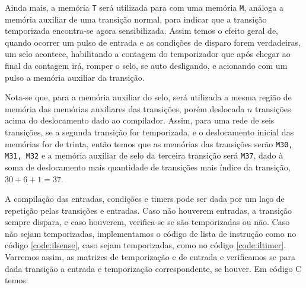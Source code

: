Ainda mais, a memória \lstinline{T} será utilizada para com uma memória \lstinline{M}, análoga a memória auxiliar de uma transição normal, para indicar que a transição temporizada encontra-se agora sensibilizada. Assim temos o efeito geral de, quando ocorrer um pulso de entrada e as condições de disparo forem verdadeiras, um selo acontece, habilitando a contagem do temporizador que após chegar ao final da contagem irá, romper o selo, se auto desligando, e acionando com um pulso a memória auxiliar da transição.




Nota-se que, para a memória auxiliar do selo, será utilizada a mesma região de memória das memórias auxiliares das transições, porém deslocada $n$ transições acima do deslocamento dado ao compilador. Assim, para uma rede de seis transições, se a segunda transição for temporizada, e o deslocamento inicial das memórias for de trinta, então temos que as memórias das transições serão \lstinline{M30, M31, M32} e a memória auxiliar de selo da terceira transição será \lstinline{M37}, dado à soma de deslocamento mais quantidade de transições mais índice da transição, $30 + 6 + 1 = 37$.

A compilação das entradas, condições e timers pode ser dada por um laço de repetição pelas transições e entradas. Caso não houverem entradas, a transição sempre dispara, e caso houverem, verifica-se se são temporizadas ou não. Caso não sejam temporizadas, implementamos o código de lista de instrução como no código \ref{code:ilsense}, caso sejam temporizadas, como no código \ref{code:iltimer}. Varremos assim, as matrizes de temporização e de entrada e verificamos se para dada transição a entrada e temporização correspondente, se houver. Em código C temos: 



